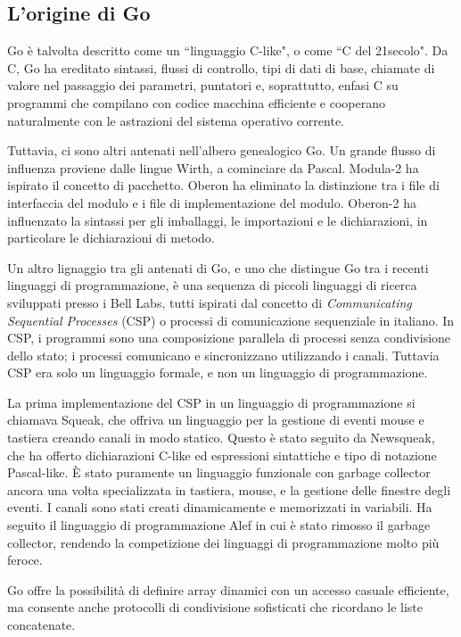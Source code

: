 \documentclass[../../thesis.tex]{subfiles}
\begin{document}
    \subsection*{L'origine di Go}
    Go è talvolta descritto come un ``linguaggio C-like", o come ``C del 21\degree secolo".
    Da C, Go ha ereditato sintassi, flussi di controllo, tipi di dati di base, chiamate di valore nel passaggio dei parametri, puntatori e, soprattutto, enfasi C su programmi che compilano con codice macchina efficiente e cooperano naturalmente con le astrazioni del sistema operativo corrente.
    \hfill \vspace{12pt}

    Tuttavia, ci sono altri antenati nell'albero genealogico Go. Un grande flusso di influenza proviene dalle lingue Wirth, a cominciare da Pascal.
    Modula-2 ha ispirato il concetto di pacchetto.
    Oberon ha eliminato la distinzione tra i file di interfaccia del modulo e i file di implementazione del modulo.
    Oberon-2 ha influenzato la sintassi per gli imballaggi, le importazioni e le dichiarazioni, in particolare le dichiarazioni di metodo.
    \hfill \vspace{12pt}

    Un altro lignaggio tra gli antenati di Go, e uno che distingue Go tra i recenti linguaggi di programmazione, è una sequenza di piccoli linguaggi di ricerca sviluppati presso i Bell Labs, tutti ispirati dal concetto di \textit{Communicating Sequential Processes} (CSP) o processi di comunicazione sequenziale in italiano.
    In CSP, i programmi sono una composizione parallela di processi senza condivisione dello stato;
    i processi comunicano e sincronizzano utilizzando i canali.
    Tuttavia CSP era solo un linguaggio formale, e non un linguaggio di programmazione.
    \hfill \vspace{12pt}

    La prima implementazione del CSP in un linguaggio di programmazione si chiamava Squeak, che offriva un linguaggio per la gestione di eventi mouse e tastiera creando canali in modo statico.
    Questo è stato seguito da Newsqueak, che ha offerto dichiarazioni C-like ed espressioni sintattiche e tipo di notazione Pascal-like.
    È stato puramente un linguaggio funzionale con garbage collector ancora una volta specializzata in tastiera, mouse, e la gestione delle finestre degli eventi.
    I canali sono stati creati dinamicamente e memorizzati in variabili.
    Ha seguito il linguaggio di programmazione Alef in cui è stato rimosso il garbage collector, rendendo la competizione dei linguaggi di programmazione molto più feroce.
    \hfill \vspace{12pt}

    Go offre la possibilità di definire array dinamici con un accesso casuale efficiente, ma consente anche protocolli di condivisione sofisticati che ricordano le liste concatenate.
\end{document}
